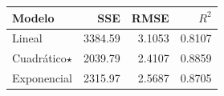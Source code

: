 \begin{tabular}{l r r r}
\toprule
Modelo & SSE & RMSE & $R^2$ \\
\midrule
Lineal & \num{3384.59} & \num{3.1053} & \num{0.8107} \\
Cuadrático\;$\star$ & \num{2039.79} & \num{2.4107} & \num{0.8859} \\
Exponencial & \num{2315.97} & \num{2.5687} & \num{0.8705} \\
\bottomrule
\end{tabular}

